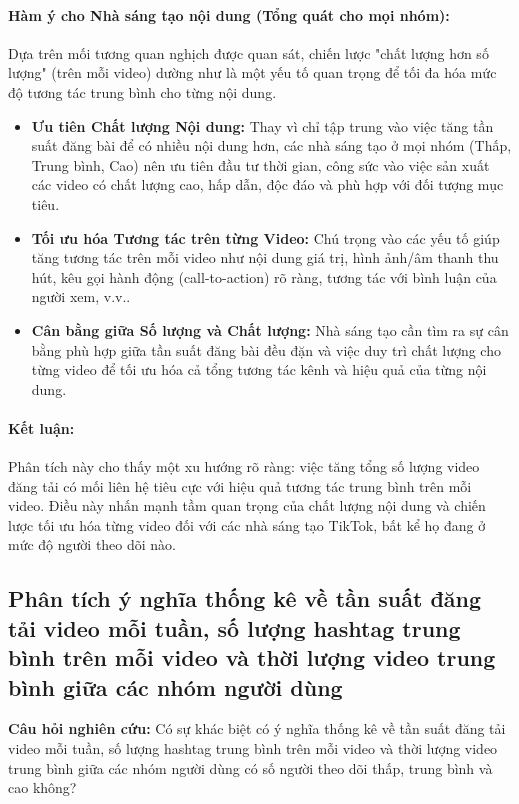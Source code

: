 \paragraph{Hàm ý cho Nhà sáng tạo nội dung (Tổng quát cho mọi nhóm):}
Dựa trên mối tương quan nghịch được quan sát, chiến lược "chất lượng hơn số lượng" (trên mỗi video) dường như là một yếu tố quan trọng để tối đa hóa mức độ tương tác trung bình cho từng nội dung.
\begin{itemize}
    \item \textbf{Ưu tiên Chất lượng Nội dung:} Thay vì chỉ tập trung vào việc tăng tần suất đăng bài để có nhiều nội dung hơn, các nhà sáng tạo ở mọi nhóm (Thấp, Trung bình, Cao) nên ưu tiên đầu tư thời gian, công sức vào việc sản xuất các video có chất lượng cao, hấp dẫn, độc đáo và phù hợp với đối tượng mục tiêu.
    
    \item \textbf{Tối ưu hóa Tương tác trên từng Video:} Chú trọng vào các yếu tố giúp tăng tương tác trên mỗi video như nội dung giá trị, hình ảnh/âm thanh thu hút, kêu gọi hành động (call-to-action) rõ ràng, tương tác với bình luận của người xem, v.v..
    
    \item \textbf{Cân bằng giữa Số lượng và Chất lượng:} Nhà sáng tạo cần tìm ra sự cân bằng phù hợp giữa tần suất đăng bài đều đặn và việc duy trì chất lượng cho từng video để tối ưu hóa cả tổng tương tác kênh và hiệu quả của từng nội dung.
\end{itemize}

\paragraph{Kết luận:}
Phân tích này cho thấy một xu hướng rõ ràng: việc tăng tổng số lượng video đăng tải có mối liên hệ tiêu cực với hiệu quả tương tác trung bình trên mỗi video. Điều này nhấn mạnh tầm quan trọng của chất lượng nội dung và chiến lược tối ưu hóa từng video đối với các nhà sáng tạo TikTok, bất kể họ đang ở mức độ người theo dõi nào.


\subsection{Phân tích ý nghĩa thống kê về tần suất đăng tải video mỗi tuần, số lượng hashtag trung bình trên mỗi video và thời lượng video trung bình giữa các nhóm người dùng}

\textbf{Câu hỏi nghiên cứu:}
Có sự khác biệt có ý nghĩa thống kê về tần suất đăng tải video mỗi tuần, số lượng hashtag trung bình trên mỗi video và thời lượng video trung bình giữa các nhóm người dùng có số người theo dõi thấp, trung bình và cao không?

